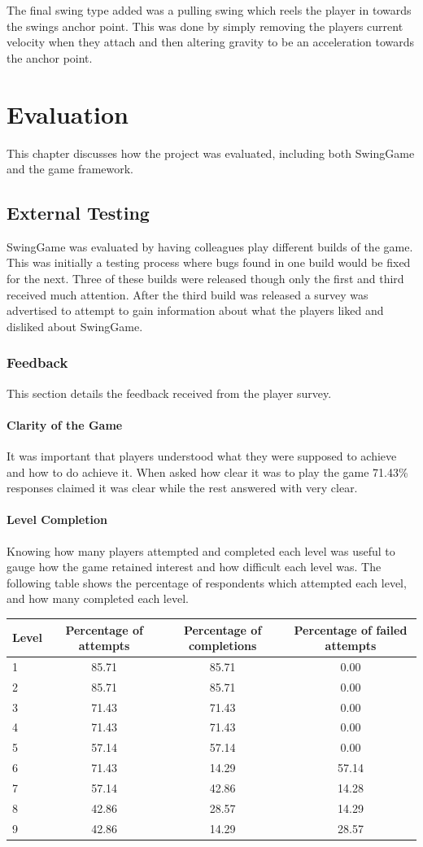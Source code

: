 \documentclass[]{report}
\begin{document}
			The final swing type added was a pulling swing which reels the player in towards the swings anchor point. This was done by simply removing the players current velocity when they attach and then altering gravity to be an acceleration towards the anchor point.
		

\chapter{Evaluation}
This chapter discusses how the project was evaluated, including both SwingGame and the game framework.
	\section{External Testing}
	SwingGame was evaluated by having colleagues play different builds of the game. This was initially a testing process where bugs found in one build would be fixed for the next. Three of these builds were released though only the first and third received much attention. After the third build was released a survey was advertised to attempt to gain information about what the players liked and disliked about SwingGame.
		\subsection{Feedback}
		This section details the feedback received from the player survey.
			\subsubsection{Clarity of the Game}
			It was important that players understood what they were supposed to achieve and how to do achieve it. When asked how clear it was to play the game 71.43\% responses claimed it was clear while the rest answered with very clear.
			\subsubsection{Level Completion}
			Knowing how many players attempted and completed each level was useful to gauge how the game retained interest and how difficult each level was. The following table shows the percentage of respondents which attempted each level, and how many completed each level.
			
			\begin{tabular}[H]{ l || c | c | c}
				Level & Percentage of attempts & Percentage of completions & Percentage of failed attempts \\
				\hline
				1 & 85.71 & 85.71 & 0.00 \\
				2 & 85.71 & 85.71 & 0.00 \\
				3 & 71.43 & 71.43 & 0.00 \\
				4 & 71.43 & 71.43 & 0.00 \\
				5 & 57.14 & 57.14 & 0.00 \\
				6 & 71.43 & 14.29 & 57.14 \\
				7 & 57.14 & 42.86 & 14.28 \\
				8 & 42.86 & 28.57 & 14.29 \\
				9 & 42.86 & 14.29 & 28.57 \\
			\end{tabular}
			
\end{document}
